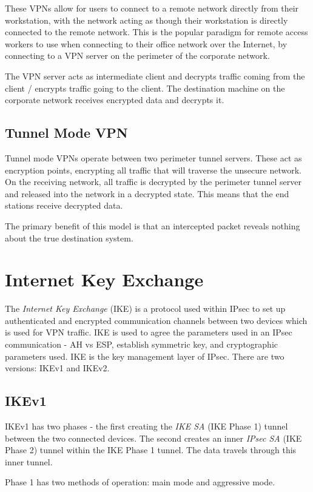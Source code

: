 These VPNs allow for users to connect to a remote network directly from their workstation, with the network acting as though their workstation is directly connected to the remote network. This is the popular paradigm for remote access workers to use when connecting to their office network over the Internet, by connecting to a VPN server on the perimeter of the corporate network.

The VPN server acts as intermediate client and decrypts traffic coming from the client / encrypts traffic going to the client. The destination machine on the corporate network receives encrypted data and decrypts it.

\subsection{Tunnel Mode VPN}
Tunnel mode VPNs operate between two perimeter tunnel servers. These act as encryption points, encrypting all traffic that will traverse the unsecure network. On the receiving network, all traffic is decrypted by the perimeter tunnel server and released into the network in a decrypted state. This means that the end stations receive decrypted data. 

The primary benefit of this model is that an intercepted packet reveals nothing about the true destination system. 

\section{Internet Key Exchange}
The \textit{Internet Key Exchange} (IKE) is a protocol used within IPsec to set up authenticated and encrypted communication channels between two devices which is used for VPN traffic. IKE is used to agree the parameters used in an IPsec communication - AH vs ESP, establish symmetric key, and cryptographic parameters used. IKE is the key management layer of IPsec. There are two versions: IKEv1 and IKEv2.

\subsection{IKEv1}
IKEv1 has two phases - the first creating the \textit{IKE SA} (IKE Phase 1) tunnel between the two connected devices. The second creates an inner \textit{IPsec SA} (IKE Phase 2) tunnel within the IKE Phase 1 tunnel. The data travels through this inner tunnel. 

Phase 1 has two methods of operation: main mode and aggressive mode.

